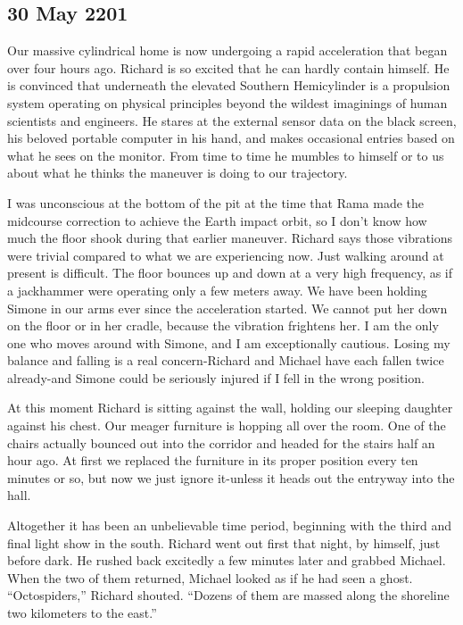 \documentclass[]{article}
\begin{document}
\subsection*{30 May 2201}

Our massive cylindrical home is now undergoing a rapid acceleration that began over four hours ago.  Richard is so excited that he can hardly contain himself.  He is convinced that underneath the elevated Southern Hemicylinder is a propulsion system operating on physical principles beyond the wildest imaginings of human scientists and engineers.  He stares at the external sensor data on the black screen, his beloved portable computer in his hand, and makes occasional entries based on what he sees on the monitor.  From time to time he mumbles to himself or to us about what he thinks the maneuver is doing to our trajectory.

I was unconscious at the bottom of the pit at the time that Rama made the midcourse correction to achieve the Earth impact orbit, so I don’t know how much the floor shook during that earlier maneuver.  Richard says those vibrations were trivial compared to what we are experiencing now.  Just walking around at present is difficult.  The floor bounces up and down at a very high frequency, as if a jackhammer were operating only a few meters away.  We have been holding Simone in our arms ever since the acceleration started.  We cannot put her down on the floor or in her cradle, because the vibration frightens her.  I am the only one who moves around with Simone, and I am exceptionally cautious.  Losing my balance and falling is a real concern-Richard and Michael have each fallen twice already-and Simone could be seriously injured if I fell in the wrong position.

At this moment Richard is sitting against the wall, holding our sleeping daughter against his chest.  Our meager furniture is hopping all over the room.  One of the chairs actually bounced out into the corridor and headed for the stairs half an hour ago.  At first we replaced the furniture in its proper position every ten minutes or so, but now we just ignore it-unless it heads out the entryway into the hall.

Altogether it has been an unbelievable time period, beginning with the third and final light show in the south.  Richard went out first that night, by himself, just before dark.  He rushed back excitedly a few minutes later and grabbed Michael.  When the two of them returned, Michael looked as if he had seen a ghost.  “Octospiders,” Richard shouted.  “Dozens of them are massed along the shoreline two kilometers to the east.”
\end{document}
